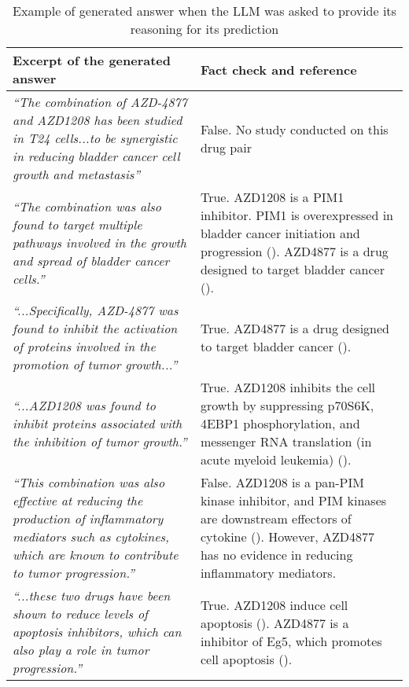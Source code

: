 \begin{table}[!htp]
\begin{tabular}{|p{3in}|p{3in}|}\toprule
Excerpt of the generated answer & Fact check and reference \\ \hline
\emph{``The combination of AZD-4877 and AZD1208 has been studied in T24 cells...to be synergistic in reducing bladder cancer cell growth and metastasis''} &False. No study conducted on this drug pair \\ \hline
\emph{``The combination was also found to target multiple pathways involved in the growth and spread of bladder cancer cells.''} &True. AZD1208 is a PIM1 inhibitor. PIM1 is overexpressed in bladder cancer initiation and progression (\cite{Guo2010-ly}). AZD4877 is a drug designed to target bladder cancer (\cite{Jones2013-zl}). \\ \hline
\emph{``...Specifically, AZD-4877 was found to inhibit the activation of proteins involved in the promotion of tumor growth...''} &True. AZD4877 is a drug designed to target bladder cancer (\cite{Jones2013-zl}). \\ \hline
\emph{``...AZD1208 was found to inhibit proteins associated with the inhibition of tumor growth.''} &True. AZD1208 inhibits the cell growth by suppressing p70S6K, 4EBP1 phosphorylation, and messenger RNA translation (in acute myeloid leukemia) (\cite{Cortes2018-tx}). \\ \hline
\emph{``This combination was also effective at reducing the production of inflammatory mediators such as cytokines, which are known to contribute to tumor progression.''} &False. AZD1208 is a pan-PIM kinase inhibitor, and PIM kinases are downstream effectors of cytokine (\cite{noauthor_2011-op}). However, AZD4877 has no evidence in reducing inflammatory mediators. \\ \hline
\emph{``...these two drugs have been shown to reduce levels of apoptosis inhibitors, which can also play a role in tumor progression.''} &True. AZD1208 induce cell apoptosis (\cite{Cervantes-Gomez2019-de}). AZD4877 is a inhibitor of Eg5, which promotes cell apoptosis (\cite{Borthakur2009-wg}). \\
\bottomrule
\end{tabular}
\caption{Example of generated answer when the LLM was asked to provide its reasoning for its prediction}\label{tab:reasoning}
\end{table}
